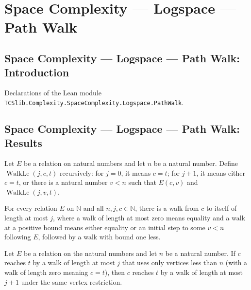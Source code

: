 \section{Space Complexity --- Logspace --- Path Walk}
\subsection*{Space Complexity --- Logspace --- Path Walk: Introduction}

Declarations of the Lean module \texttt{TCSlib.Complexity.SpaceComplexity.Logspace.PathWalk}.

\subsection*{Space Complexity --- Logspace --- Path Walk: Results}

\begin{definition}
\label{Complexity.WalkLe}
\leanok
Let $E$ be a relation on natural numbers and let $n$ be a natural number. Define
$\operatorname{WalkLe}(j,c,t)$ recursively: for $j=0$, it means $c=t$; for $j+1$, it
means either $c=t$, or there is a natural number $v<n$ such that $E(c,v)$ and
$\operatorname{WalkLe}(j,v,t)$.
\end{definition}

\begin{lemma}
\label{Complexity.walkLe_refl}
\leanok
{}
For every relation $E$ on $\mathbb{N}$ and all $n,j,c\in\mathbb{N}$, there is a walk
from $c$ to itself of length at most $j$, where a walk of length at most zero means
equality and a walk at a positive bound means either equality or an initial step to some
$v<n$ following $E$, followed by a walk with bound one less.
\end{lemma}

\begin{lemma}
\label{Complexity.walkLe_succ}
\leanok
{}
Let $E$ be a relation on the natural numbers and let $n$ be a natural number. If $c$
reaches $t$ by a walk of length at most $j$ that uses only vertices less than $n$ (with
a walk of length zero meaning $c=t$), then $c$ reaches $t$ by a walk of length at most
$j+1$ under the same vertex restriction.
\end{lemma}

